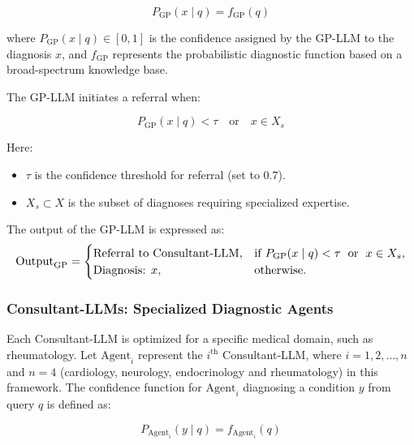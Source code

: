 \documentclass[letterpaper]{article} %
\begin{document}
\begin{equation}
P_{\text{GP}}(x \mid q) = f_{\text{GP}}(q)
\end{equation}

where \( P_{\text{GP}}(x \mid q) \in [0, 1] \) is the confidence assigned by the GP-LLM to the diagnosis \( x \), and \( f_{\text{GP}} \) represents the probabilistic diagnostic function based on a broad-spectrum knowledge base.

The GP-LLM initiates a referral when:

\begin{equation}
P_{\text{GP}}(x \mid q) < \tau \quad \text{or} \quad x \in X_s
\end{equation}

Here:
\begin{itemize}
    \item \( \tau \) is the confidence threshold for referral (set to \( 0.7 \)).
    \item \( X_s \subset X \) is the subset of diagnoses requiring specialized expertise.
\end{itemize}
The output of the GP-LLM is expressed as:
\begin{equation}
    \resizebox{\linewidth}{!}{$
    \text{Output}_{\text{GP}} = 
    \begin{cases} 
    \text{Referral to Consultant-LLM}, & \text{if } P_{\text{GP}}(x \mid q) < \tau \; \text{ or } \; x \in X_s, \\
    \text{Diagnosis: } x, & \text{otherwise.}
    \end{cases}
    $}
\end{equation}

\subsubsection{Consultant-LLMs: Specialized Diagnostic Agents}

Each Consultant-LLM is optimized for a specific medical domain, such as rheumatology. Let \( \text{Agent}_i \) represent the \( i^{\text{th}} \) Consultant-LLM, where \( i = 1, 2, \dots, n \) and \( n = 4 \) (cardiology, neurology, endocrinology and rheumatology) in this framework. The confidence function for \( \text{Agent}_i \) diagnosing a condition \( y \) from query \( q \) is defined as:

\begin{equation}
P_{\text{Agent}_i}(y \mid q) = f_{\text{Agent}_i}(q)
\end{equation}
\end{document}
